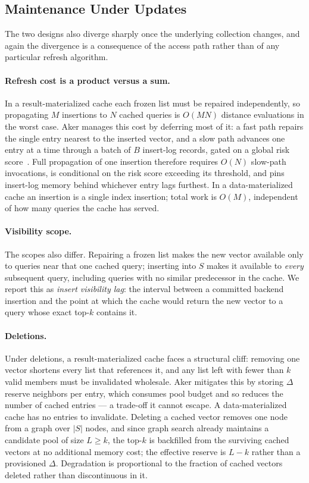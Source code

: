 \subsection{Maintenance Under Updates}
\label{sec:ds-updates}

The two designs also diverge sharply once the underlying collection
changes, and again the divergence is a consequence of the access path
rather than of any particular refresh algorithm.

\paragraph{Refresh cost is a product versus a sum.}
In a result-materialized cache each frozen list must be repaired
independently, so propagating $M$ insertions to $N$ cached queries is
$O(MN)$ distance evaluations in the worst case. Aker manages this cost
by deferring most of it: a fast path repairs the single entry nearest to
the inserted vector, and a slow path advances one entry at a time
through a batch of $B$ insert-log records, gated on a global risk
score~\cite{aker}. Full propagation of one insertion therefore requires
$O(N)$ slow-path invocations, is conditional on the risk score
exceeding its threshold, and pins insert-log memory behind whichever
entry lags furthest. In a data-materialized cache an insertion is a
single index insertion; total work is $O(M)$, independent of how many
queries the cache has served.

\paragraph{Visibility scope.}
The scopes also differ. Repairing a frozen list makes the new vector
available only to queries near that one cached query; inserting into $S$
makes it available to \emph{every} subsequent query, including queries
with no similar predecessor in the cache. We report this as \emph{insert
visibility lag}: the interval between a committed backend insertion and
the point at which the cache would return the new vector to a query
whose exact top-$k$ contains it.

\paragraph{Deletions.}
Under deletions, a result-materialized cache faces a structural cliff:
removing one vector shortens every list that references it, and any list
left with fewer than $k$ valid members must be invalidated wholesale.
Aker mitigates this by storing $\Delta$ reserve neighbors per entry,
which consumes pool budget and so reduces the number of cached entries
--- a trade-off it cannot escape. A data-materialized cache has no
entries to invalidate. Deleting a cached vector removes one node from a
graph over $|S|$ nodes, and since graph search already maintains a
candidate pool of size $L \ge k$, the top-$k$ is backfilled from the
surviving cached vectors at no additional memory cost; the effective
reserve is $L-k$ rather than a provisioned $\Delta$. Degradation is
proportional to the fraction of cached vectors deleted rather than
discontinuous in it.

